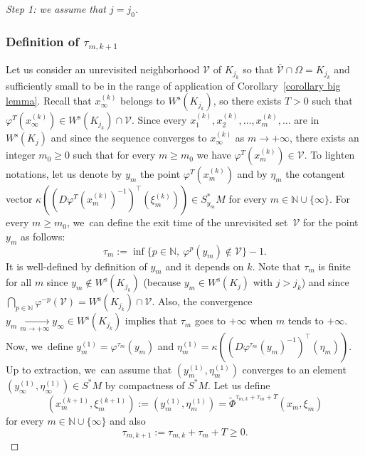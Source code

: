 \documentclass[JEP,XML,SOM,Unicode,NoEqCountersInSection,NoFloatCountersInSection,published]{cedram}
\newcommand{\rs}{\mathrm{s}}
\theoremstyle{definition}
\theoremstyle{plain}
\newcommand{\N}{\mathbb{N}}
\newcommand{\Vcal}{\mathcal{V}}
\begin{document}
\begin{proof}[Step 1: we assume that $j = j_0$]
\subsubsection*{Definition of $\tau_{m,k+1}$} Let us consider an unrevisited neighborhood $\Vcal$ of $K_{j_k}$ so that $\overline{\Vcal} \cap \Omega = K_{j_k}$ and sufficiently small to be in the range of application of Corollary~\ref{corollary big lemma}. Recall that $x_{\infty}^{(k)}$ belongs to $W^\rs (K_{j_k})$, so there exists $T > 0$ such that $\varphi^T (x_{\infty}^{(k)}) \in W^\rs (K_{j_k}) \cap \Vcal$. Since every $x_{1}^{(k)}, x_{2}^{(k)},\dots, x_{m}^{(k)},\dots$ are in $W^\rs (K_{j})$ and since the sequence converges to $x_{\infty}^{(k)}$ as $m \to + \infty$, there exists an integer $m_0 \geq 0$ such that for every $m \geq m_0$ we have $\varphi^T (x_m^{(k)}) \in \Vcal$.
To lighten notations, let us denote by $y_m$ the point $\varphi^T (x_{m}^{(k)})$ and by $\eta_m$ the cotangent vector $\kappa ((D \varphi^{T} (x_m^{(k)})^{-1})^{\top} (\xi_m^{(k)})) \in S_{y_m}^* M$ for every $m \in \N \cup \{ \infty \}$.
For every $m \geq m_0$, we~can define the exit time of the unrevisited set~$\Vcal$ for the point~$y_m$ as follows:
\[
\tau_m:= \inf \{ p \in \N, \: \varphi^p (y_m) \notin \Vcal \} -1.
\]
It is well-defined by definition of $y_m$ and it depends on $k$. Note that $\tau_m$ is finite for all $m$ since $y_m \notin W^\rs (K_{j_k})$ (because $y_m \in W^\rs (K_j)$ with $j > j_k$) and since $\bigcap_{p \in \N} \varphi^{-p} (\Vcal) = W^\rs (K_{j_k}) \cap \Vcal$. Also, the convergence $y_m \underset{m \to +\infty}{\to} y_{\infty} \in W^\rs (K_{j_k})$ implies that $\tau_m$ goes to $+\infty$ when $m$ tends to $+\infty$. Now, we~define $y_m^{(1)} = \varphi^{\tau_m} (y_m)$ and $\eta_m^{(1)} = \kappa ((D\varphi^{\tau_m} (y_m)^{-1})^{ \top} (\eta_m))$. Up to extraction, we~can assume that $(y_m^{(1)}, \eta_m^{(1)})$ converges to an element $(y_{\infty}^{(1)},\eta_{\infty}^{(1)}) \in S^*M$ by compactness of $S^* M$. Let us define
\[
(x_m^{(k+1)}, \xi_m^{(k+1)}):= (y_m^{(1)}, \eta_m^{(1)}) = \widetilde{\Phi}^{\tau_{m,k} + \tau_m + T} (x_m, \xi_m)
\]
for every $m \in \N \cup \{ \infty \}$ and also
\[
\tau_{m, k+ 1}:= \tau_{m,k} + \tau_m + T \geq 0.
\]

\end{proof}
\end{document}
